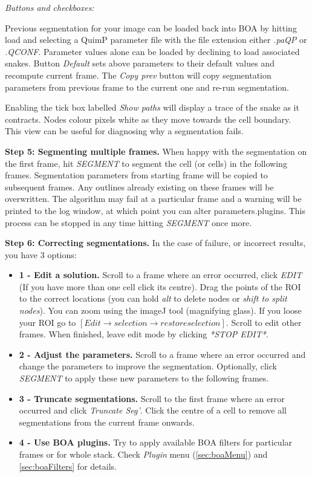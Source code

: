 \documentclass[a4paper,12pt]{article}
\begin{document}
\textit{Buttons and checkboxes:}

Previous segmentation for your image can be loaded
back into BOA by hitting load and selecting a QuimP parameter file with the file extension either \textit{.paQP} or \textit{.QCONF}. Parameter values alone can be loaded by declining to load associated snakes. Button \textit{Default} sets above parameters to their default values and recompute current frame. The \textit{Copy prev} button will copy segmentation parameters from previous frame to the current one and re-run segmentation.

Enabling the tick box labelled \textit{Show paths} will display a trace of the snake as it contracts.  Nodes colour pixels white as they move towards the cell boundary.  This view can be useful for diagnosing why a segmentation fails.


\textbf{Step 5: Segmenting multiple frames.}  When happy with the segmentation on the first frame, hit \textit{SEGMENT} to segment
the cell (or cells) in the following frames. Segmentation parameters from starting frame will be copied to subsequent frames. Any outlines already existing on these frames will be overwritten. The algorithm may fail at a particular frame and a warning will be printed to the log window,
at which point you can alter parameters.plugins. This process can be stopped in any time hitting \textit{SEGMENT} once more.

\textbf{Step 6: Correcting segmentations.}  In the case of failure, or incorrect results, you have 3 options:

\begin{itemize}
\item \textbf{1 - Edit a solution.} Scroll to a frame where an error occurred, click \textit{EDIT} (If you have more than one cell
click its centre). Drag the points of the ROI to the correct locations (you can hold \textit{alt} to delete nodes or \textit{shift to split nodes}).
You can zoom using the imageJ tool (magnifying glass). If you loose your ROI go to $[Edit\rightarrow selection\rightarrow restore selection]$.
Scroll to edit other frames.  When finished, leave edit mode by clicking \textit{*STOP EDIT*}.
\item \textbf{2 - Adjust the parameters.}  Scroll to a frame where an error occurred and change the parameters to improve the segmentation.
Optionally, click \textit{SEGMENT} to apply these new parameters to the following frames.
\item \textbf{3 - Truncate segmentations.}  Scroll to the first frame where an error occurred and click \textit{Truncate Seg'}.  Click the centre
of a cell to remove all segmentations from the current frame onwards.
\item \textbf{4 - Use BOA plugins.} Try to apply available BOA filters for particular frames or for whole stack. Check \textit{Plugin} menu (\autoref{sec:boaMenu}) and \autoref{sec:boaFilters} for details.
\end{itemize}
\end{document}
